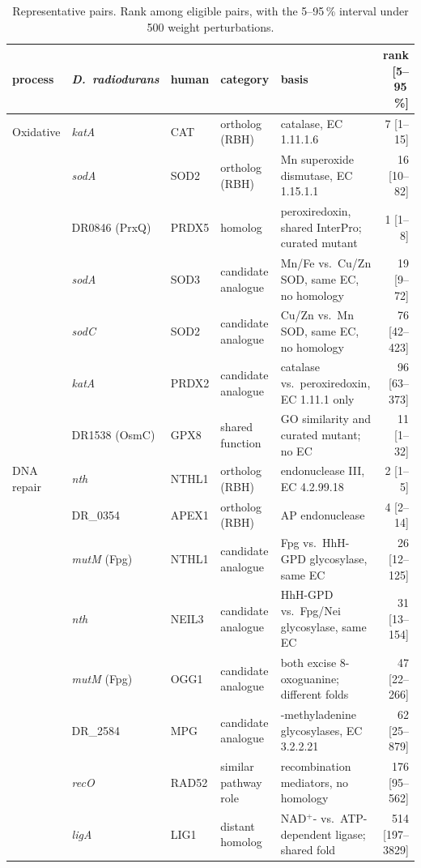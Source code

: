 \documentclass[conference]{IEEEtran}
\newcommand{\Dr}{\emph{D.~radiodurans}}
\newcommand{\gene}[1]{\textit{#1}}
\begin{document}
\begin{table}[t]
\centering
\caption{Representative pairs. Rank among eligible pairs, with the 5--95\,\% interval under 500
weight perturbations.}
\label{tab:pairs}
\footnotesize
\begin{tabular}{llll>{\raggedright\arraybackslash}p{6.2cm}r}
\toprule
process & \Dr & human & category & basis & rank [5--95\,\%] \\
\midrule
Oxidative & \gene{katA} & CAT & ortholog (RBH) & catalase, EC 1.11.1.6 & 7 [1--15] \\
 & \gene{sodA} & SOD2 & ortholog (RBH) & Mn superoxide dismutase, EC 1.15.1.1 & 16 [10--82] \\
 & DR0846 (PrxQ) & PRDX5 & homolog & peroxiredoxin, shared InterPro; curated mutant & 1 [1--8] \\
 & \gene{sodA} & SOD3 & candidate analogue & Mn/Fe vs.\ Cu/Zn SOD, same EC, no homology & 19 [9--72] \\
 & \gene{sodC} & SOD2 & candidate analogue & Cu/Zn vs.\ Mn SOD, same EC, no homology & 76 [42--423] \\
 & \gene{katA} & PRDX2 & candidate analogue & catalase vs.\ peroxiredoxin, EC 1.11.1 only & 96 [63--373] \\
 & DR1538 (OsmC) & GPX8 & shared function & GO similarity and curated mutant; no EC & 11 [1--32] \\
\midrule
DNA repair & \gene{nth} & NTHL1 & ortholog (RBH) & endonuclease III, EC 4.2.99.18 & 2 [1--5] \\
 & DR\_0354 & APEX1 & ortholog (RBH) & AP endonuclease & 4 [2--14] \\
 & \gene{mutM} (Fpg) & NTHL1 & candidate analogue & Fpg vs.\ HhH-GPD glycosylase, same EC & 26 [12--125] \\
 & \gene{nth} & NEIL3 & candidate analogue & HhH-GPD vs.\ Fpg/Nei glycosylase, same EC & 31 [13--154] \\
 & \gene{mutM} (Fpg) & OGG1 & candidate analogue & both excise 8-oxoguanine; different folds & 47 [22--266] \\
 & DR\_2584 & MPG & candidate analogue & 3-methyladenine glycosylases, EC 3.2.2.21 & 62 [25--879] \\
 & \gene{recO} & RAD52 & similar pathway role & recombination mediators, no homology & 176 [95--562] \\
 & \gene{ligA} & LIG1 & distant homolog & NAD$^+$- vs.\ ATP-dependent ligase; shared fold & 514 [197--3829] \\
\bottomrule
\end{tabular}
\end{table}
\end{document}
